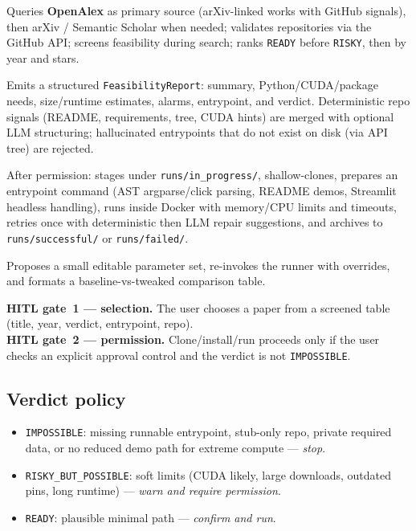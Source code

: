\documentclass[11pt,a4paper]{article}
\begin{document}
\begin{description}[style=nextline,leftmargin=1.35cm,itemsep=3pt]
  \item[PaperFinder]
    Queries \textbf{OpenAlex} as primary source (arXiv-linked works with GitHub
    signals), then arXiv / Semantic Scholar when needed; validates repositories
    via the GitHub API; screens feasibility during search; ranks
    \texttt{READY} before \texttt{RISKY}, then by year and stars.
  \item[FeasibilityAnalyst]
    Emits a structured \texttt{FeasibilityReport}: summary, Python/CUDA/package
    needs, size/runtime estimates, alarms, entrypoint, and verdict. Deterministic
    repo signals (README, requirements, tree, CUDA hints) are merged with optional
    LLM structuring; hallucinated entrypoints that do not exist on disk (via API
    tree) are rejected.
  \item[ExperimentRunner]
    After permission: stages under \texttt{runs/in\_progress/}, shallow-clones,
    prepares an entrypoint command (AST argparse/click parsing, README demos,
    Streamlit headless handling), runs inside Docker with memory/CPU limits and
    timeouts, retries once with deterministic then LLM repair suggestions, and
    archives to \texttt{runs/successful/} or \texttt{runs/failed/}.
  \item[ParamTweaker]
    Proposes a small editable parameter set, re-invokes the runner with
    overrides, and formats a baseline-vs-tweaked comparison table.
\end{description}

\textbf{HITL gate~1 --- selection.} The user chooses a paper from a screened
table (title, year, verdict, entrypoint, repo).\\
\textbf{HITL gate~2 --- permission.} Clone/install/run proceeds only if the
user checks an explicit approval control and the verdict is not
\texttt{IMPOSSIBLE}.

\subsection{Verdict policy}
\begin{itemize}[leftmargin=*,itemsep=2pt]
  \item \texttt{IMPOSSIBLE}: missing runnable entrypoint, stub-only repo,
        private required data, or no reduced demo path for extreme compute ---
        \emph{stop}.
  \item \texttt{RISKY\_BUT\_POSSIBLE}: soft limits (CUDA likely, large downloads,
        outdated pins, long runtime) --- \emph{warn and require permission}.
  \item \texttt{READY}: plausible minimal path --- \emph{confirm and run}.
\end{itemize}
\end{document}

